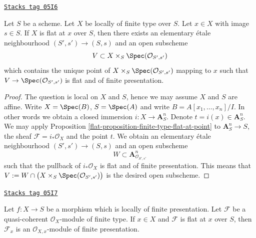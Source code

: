 \begin{lemma}
\label{flat-lemma-finite-type-flat-at-point-X}
\href{https://stacks.math.columbia.edu/tag/05I6}{\texttt{Stacks tag 05I6}}

Let $S$ be a scheme. Let $X$ be locally of finite type over $S$.
Let $x \in X$ with image $s \in S$.
If $X$ is flat at $x$ over $S$, then there exists an elementary
\'etale neighbourhood $(S', s') \to (S, s)$ and an open subscheme
$$
V \subset X \times_S \Spec(\mathcal{O}_{S', s'})
$$
which contains the unique point of
$X \times_S \Spec(\mathcal{O}_{S', s'})$ mapping to $x$
such that $V \to \Spec(\mathcal{O}_{S', s'})$
is flat and of finite presentation.
\end{lemma}

\begin{proof}

The question is local on $X$ and $S$, hence we may assume $X$ and $S$
are affine. Write $X = \Spec(B)$, $S = \Spec(A)$ and write
$B = A[x_1, \ldots, x_n]/I$. In other words we obtain a closed immersion
$i : X \to \mathbf{A}^n_S$. Denote $t = i(x) \in \mathbf{A}^n_S$.
We may apply
Proposition \ref{flat-proposition-finite-type-flat-at-point}
to $\mathbf{A}^n_S \to S$, the sheaf $\mathcal{F} = i_*\mathcal{O}_X$
and the point $t$. We obtain an elementary
\'etale neighbourhood $(S', s') \to (S, s)$ and an open subscheme
$$
W \subset \mathbf{A}^n_{\mathcal{O}_{S', s'}}
$$
such that the pullback of $i_*\mathcal{O}_X$ is flat and of finite
presentation. This means that
$V := W \cap \big(X \times_S \Spec(\mathcal{O}_{S', s'})\big)$
is the desired open subscheme.
\end{proof}

\begin{lemma}
\label{flat-lemma-finite-type-flat-at-point-local}
\href{https://stacks.math.columbia.edu/tag/05I7}{\texttt{Stacks tag 05I7}}

Let $f : X \to S$ be a morphism which is locally of finite presentation.
Let $\mathcal{F}$ be a quasi-coherent $\mathcal{O}_X$-module of finite type.
If $x \in X$ and $\mathcal{F}$ is flat at $x$ over $S$, then
$\mathcal{F}_x$ is an $\mathcal{O}_{X, x}$-module of finite presentation.
\end{lemma}

